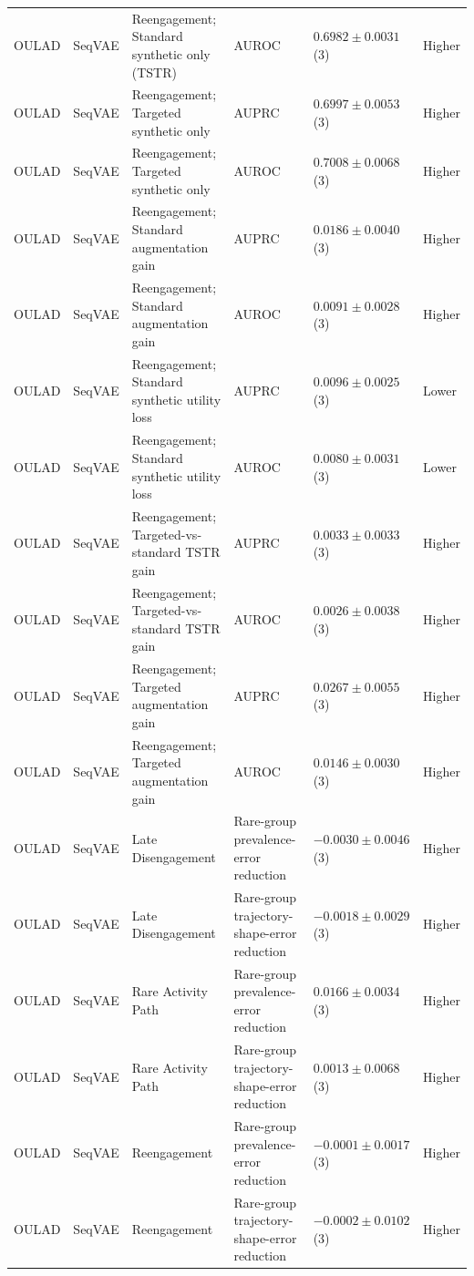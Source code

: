 \begin{longtable}{@{}p{2.25cm}p{2.05cm}p{4.7cm}p{5.0cm}p{2.6cm}p{1.25cm}@{}}
OULAD & SeqVAE & Reengagement; Standard synthetic only (TSTR) & AUROC & $0.6982 \mathbin{\pm} 0.0031$ (3) & Higher \\
OULAD & SeqVAE & Reengagement; Targeted synthetic only & AUPRC & $0.6997 \mathbin{\pm} 0.0053$ (3) & Higher \\
OULAD & SeqVAE & Reengagement; Targeted synthetic only & AUROC & $0.7008 \mathbin{\pm} 0.0068$ (3) & Higher \\
OULAD & SeqVAE & Reengagement; Standard augmentation gain & AUPRC & $0.0186 \mathbin{\pm} 0.0040$ (3) & Higher \\
OULAD & SeqVAE & Reengagement; Standard augmentation gain & AUROC & $0.0091 \mathbin{\pm} 0.0028$ (3) & Higher \\
OULAD & SeqVAE & Reengagement; Standard synthetic utility loss & AUPRC & $0.0096 \mathbin{\pm} 0.0025$ (3) & Lower \\
OULAD & SeqVAE & Reengagement; Standard synthetic utility loss & AUROC & $0.0080 \mathbin{\pm} 0.0031$ (3) & Lower \\
OULAD & SeqVAE & Reengagement; Targeted-vs-standard TSTR gain & AUPRC & $0.0033 \mathbin{\pm} 0.0033$ (3) & Higher \\
OULAD & SeqVAE & Reengagement; Targeted-vs-standard TSTR gain & AUROC & $0.0026 \mathbin{\pm} 0.0038$ (3) & Higher \\
OULAD & SeqVAE & Reengagement; Targeted augmentation gain & AUPRC & $0.0267 \mathbin{\pm} 0.0055$ (3) & Higher \\
OULAD & SeqVAE & Reengagement; Targeted augmentation gain & AUROC & $0.0146 \mathbin{\pm} 0.0030$ (3) & Higher \\
OULAD & SeqVAE & Late Disengagement & Rare-group prevalence-error reduction & $-0.0030 \mathbin{\pm} 0.0046$ (3) & Higher \\
OULAD & SeqVAE & Late Disengagement & Rare-group trajectory-shape-error reduction & $-0.0018 \mathbin{\pm} 0.0029$ (3) & Higher \\
OULAD & SeqVAE & Rare Activity Path & Rare-group prevalence-error reduction & $0.0166 \mathbin{\pm} 0.0034$ (3) & Higher \\
OULAD & SeqVAE & Rare Activity Path & Rare-group trajectory-shape-error reduction & $0.0013 \mathbin{\pm} 0.0068$ (3) & Higher \\
OULAD & SeqVAE & Reengagement & Rare-group prevalence-error reduction & $-0.0001 \mathbin{\pm} 0.0017$ (3) & Higher \\
OULAD & SeqVAE & Reengagement & Rare-group trajectory-shape-error reduction & $-0.0002 \mathbin{\pm} 0.0102$ (3) & Higher \\

\end{longtable}
